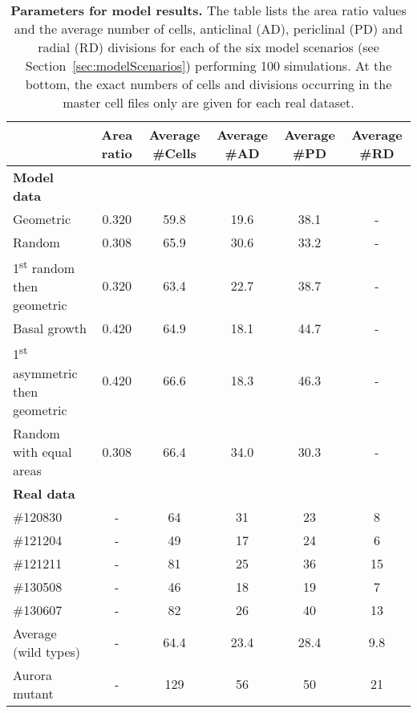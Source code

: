 \documentclass[11pt,a4paper, final]{article}
\begin{document}
%
\clearpage
%
\begin{table}\centering
\begin{tabular}{@{}lccccc@{}}\toprule
& Area ratio & Average \#Cells & Average \#AD & Average \#PD & Average \#RD\\ \midrule
\textbf{Model data}\\
Geometric & 0.320 & 59.8 & 19.6 & 38.1 & -\\
Random & 0.308 & 65.9 & 30.6 & 33.2 & -\\
1\textsuperscript{st} random then geometric & 0.320 & 63.4 & 22.7 & 38.7 & -\\
Basal growth & 0.420 & 64.9 & 18.1 & 44.7 & -\\
1\textsuperscript{st} asymmetric then geometric & 0.420 & 66.6 & 18.3 & 46.3 & -\\
Random with equal areas & 0.308 & 66.4 & 34.0 & 30.3 & -\\
\textbf{Real data}\\
\#120830 & - & 64 & 31 & 23 & 8\\
\#121204 & - & 49 & 17 & 24 & 6\\
\#121211 & - & 81 & 25 & 36 & 15\\
\#130508 & - & 46 & 18 & 19 & 7\\
\#130607 & - & 82 & 26 & 40 & 13\\
Average (wild types) & - & 64.4 & 23.4 & 28.4 & 9.8\\
Aurora mutant & - & 129 & 56 & 50 & 21\\
\bottomrule
\end{tabular}
	\caption[Parameters for model results.]{\textbf{Parameters for model results.} The table lists the area ratio values and the average number of cells, anticlinal (AD), periclinal (PD) and radial (RD) divisions for each of the six model scenarios (see Section~\ref{sec:modelScenarios}) performing 100 simulations. At the bottom, the exact numbers of cells and divisions occurring in the master cell files only are given for each real dataset.
	}
	\label{tab:modelParameters}
\end{table}
\end{document}
